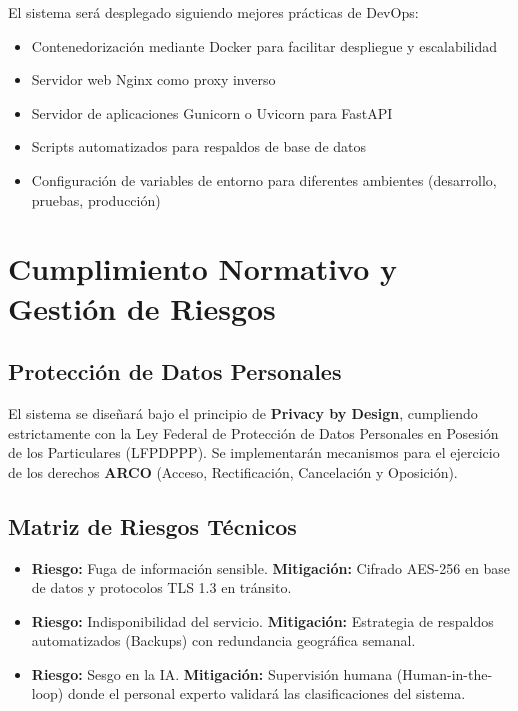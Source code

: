 \documentclass[12pt,letterpaper]{article}
\begin{document}
El sistema será desplegado siguiendo mejores prácticas de DevOps:

\begin{itemize}
    \item Contenedorización mediante Docker para facilitar despliegue y escalabilidad
    \item Servidor web Nginx como proxy inverso
    \item Servidor de aplicaciones Gunicorn o Uvicorn para FastAPI
    \item Scripts automatizados para respaldos de base de datos
    \item Configuración de variables de entorno para diferentes ambientes (desarrollo, pruebas, producción)
\end{itemize}

\newpage


\section{Cumplimiento Normativo y Gestión de Riesgos}

\subsection{Protección de Datos Personales}
El sistema se diseñará bajo el principio de \textbf{Privacy by Design}, cumpliendo estrictamente con la Ley Federal de Protección de Datos Personales en Posesión de los Particulares (LFPDPPP). Se implementarán mecanismos para el ejercicio de los derechos \textbf{ARCO} (Acceso, Rectificación, Cancelación y Oposición).

\subsection{Matriz de Riesgos Técnicos}
\begin{itemize}
    \item \textbf{Riesgo:} Fuga de información sensible. \textbf{Mitigación:} Cifrado AES-256 en base de datos y protocolos TLS 1.3 en tránsito.
    \item \textbf{Riesgo:} Indisponibilidad del servicio. \textbf{Mitigación:} Estrategia de respaldos automatizados (Backups) con redundancia geográfica semanal.
    \item \textbf{Riesgo:} Sesgo en la IA. \textbf{Mitigación:} Supervisión humana (Human-in-the-loop) donde el personal experto validará las clasificaciones del sistema.
\end{itemize}
\end{document}
